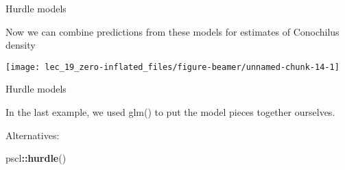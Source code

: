 \documentclass[ignorenonframetext,]{beamer}
\newenvironment{Shaded}{\begin{snugshade}}{\end{snugshade}}
\newcommand{\DataTypeTok}[1]{\textcolor[rgb]{0.13,0.29,0.53}{#1}}
\newcommand{\DecValTok}[1]{\textcolor[rgb]{0.00,0.00,0.81}{#1}}
\newcommand{\KeywordTok}[1]{\textcolor[rgb]{0.13,0.29,0.53}{\textbf{#1}}}
\newcommand{\NormalTok}[1]{#1}
\newcommand{\OperatorTok}[1]{\textcolor[rgb]{0.81,0.36,0.00}{\textbf{#1}}}
\newcommand{\StringTok}[1]{\textcolor[rgb]{0.31,0.60,0.02}{#1}}
\begin{document}
\begin{frame}[fragile]{Hurdle models}
\protect\hypertarget{hurdle-models-1}{}

Now we can combine predictions from these models for estimates of
Conochilus density

\begin{Shaded}
\end{Shaded}

\begin{center}\texttt{[image: lec\_19\_zero-inflated\_files/figure-beamer/unnamed-chunk-14-1]} \end{center}

\end{frame}

\begin{frame}[fragile]{Hurdle models}
\protect\hypertarget{hurdle-models-2}{}

In the last example, we used glm() to put the model pieces together
ourselves.

Alternatives:

\begin{Shaded}
\begin{Highlighting}[]
\NormalTok{pscl}\OperatorTok{::}\KeywordTok{hurdle}\NormalTok{()}
\end{Highlighting}
\end{Shaded}

\end{frame}
\end{document}
